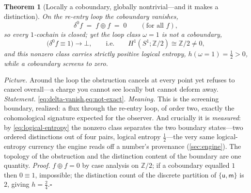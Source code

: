 \documentclass[11pt,letterpaper]{article}
\theoremstyle{plain}
\newtheorem{theorem}{Theorem}[section]
\theoremstyle{definition}
\theoremstyle{remark}
\newcommand{\bbtwo}{\mathbb{Z}/2}
\newcommand{\unmk}{\mathsf{u}}                          %
\newcommand{\mkd}{\mathsf{m}}                           %
\newcommand{\Llog}{h}                                   %
\begin{document}
\begin{theorem}[Locally a coboundary, globally nontrivial---and it makes a distinction]
\label{thm:h1}
On the re-entry loop the coboundary vanishes,
\begin{equation}\label{eq:delta-vanish}
  \delta^0 f \;=\; f\oplus f \;=\; 0 \qquad(\text{for all } f),
\end{equation}
so every $1$-cochain is closed; yet the loop class $\omega=1$ is not a coboundary,
\begin{equation}\label{eq:not-exact}
  \big(\delta^0 f \equiv 1\big)\to\bot,
  \qquad\text{i.e.}\qquad H^1(S^1;\bbtwo)\cong\bbtwo\neq 0,
\end{equation}
and this nonzero class carries strictly positive logical entropy,
$\Llog(\omega{=}1)=\tfrac12>0$, while a coboundary screens to zero.
\end{theorem}

\noindent\emph{Picture.} Around the loop the obstruction cancels at every point
yet refuses to cancel overall---a charge you cannot see locally but cannot deform
away. \emph{Statement.} \cref{eq:delta-vanish,eq:not-exact}. \emph{Meaning.} This
is the screening boundary, realized: a flux through the re-entry loop,
of order two, exactly the cohomological signature expected for the observer. And
crucially it is \emph{measured}: by \cref{eq:logical-entropy} the nonzero class
separates the two boundary states---two ordered distinctions out of four pairs,
logical entropy $\tfrac12$---the very same logical-entropy currency the engine
reads off a number's provenance (\cref{sec:engine}). The topology of the
obstruction and the distinction content of the boundary are one quantity.
\emph{Proof.} $f\oplus f=0$ by case analysis on $\bbtwo$; if a coboundary equalled
$1$ then $0\equiv1$, impossible; the distinction count of the discrete partition
of $\{\unmk,\mkd\}$ is $2$, giving $\Llog=\tfrac{2}{4}$.\hfill$\square$
\end{document}
